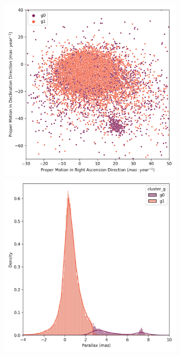 \documentclass[11pt,a4paper,english,twocolumn]{article}
\begin{document}
\begin{figure}[!htbp]
  \centering
  \begin{subfigure}[b]{0.3\textwidth}
    \centering
      \includegraphics[width=\textwidth]{../figures/kmeans/kmeans_n2_pm_melotte_22.png}
      \includegraphics[width=\textwidth]{../figures/kmeans/kmeans_n2_parallax_melotte_22.png}

\end{subfigure}
\end{figure}
\end{document}
